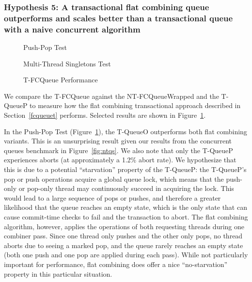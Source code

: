 \vspace{12pt}
\noindent{}

\subsubsection{Hypothesis 5: A transactional flat combining queue outperforms and scales better than a transactional queue with a naive concurrent algorithm}

\begin{figure}[H]
    \centering
	\begin{minipage}{0.75\textwidth}
        \caption*{Push-Pop Test}
        \vspace{12pt}
	\end{minipage}
   	\begin{minipage}{0.75\textwidth}
        \caption*{Multi-Thread Singletons Test}
	\end{minipage}
        \caption{T-FCQueue Performance}
    \label{fig:tqs}
\end{figure}

We compare the T-FCQueue against the NT-FCQueueWrapped and the T-QueueP to measure how the flat combining transactional approach described in Section~\ref{fcqueuet} performs. Selected results are shown in Figure~\ref{fig:tqs}.

In the Push-Pop Test (Figure~\ref{fig:tqs}), the T-QueueO outperforms both flat combining variants. This is an unsurprising result given our results from the concurrent queues benchmark in Figure~\ref{fig:ntqs}. We also note that only the T-QueueP experiences aborts (at approximately a 1.2\% abort rate). We hypothesize that this is due to a potential ``starvation'' property of the T-QueueP: the T-QueueP's pop or push operations acquire a global queue lock, which means that the push-only or pop-only thread may continuously succeed in acquiring the lock. This would lead to a large sequence of pops or pushes, and therefore a greater likelihood that the queue reaches an empty state, which is the only state that can cause commit-time checks to fail and the transaction to abort. The flat combining algorithm, however, applies the operations of both requesting threads during one combiner pass. Since one thread only pushes and the other only pops, no thread aborts due to seeing a marked pop, and the queue rarely reaches an empty state (both one push and one pop are applied during each pass). While not particularly important for performance, flat combining does offer a nice ``no-starvation'' property in this particular situation.

